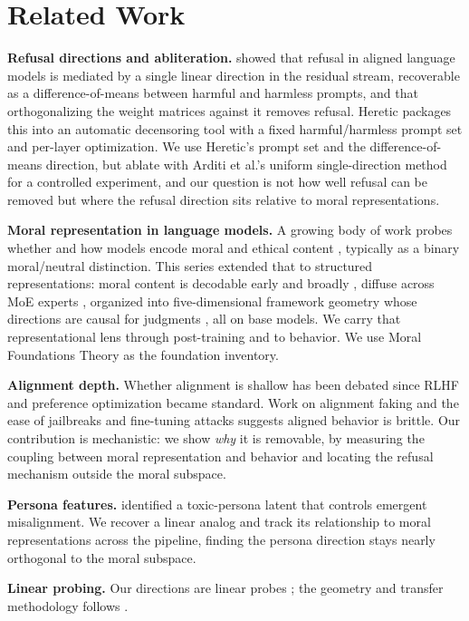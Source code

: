 \section{Related Work}\label{related-work}

\textbf{Refusal directions and abliteration.} \citet{arditi2024refusal} showed that
refusal in aligned language models is mediated by a single linear direction in
the residual stream, recoverable as a difference-of-means between harmful and
harmless prompts, and that orthogonalizing the weight matrices against it
removes refusal. Heretic \citep{pew2025heretic} packages this into an automatic
decensoring tool with a fixed harmful/harmless prompt set and per-layer
optimization. We use Heretic's prompt set and the difference-of-means
direction, but ablate with Arditi et al.'s uniform single-direction method for a
controlled experiment, and our question is not how well refusal can be removed
but where the refusal direction sits relative to moral representations.

\textbf{Moral representation in language models.} A growing body of work probes
whether and how models encode moral and ethical content
\citep{hendrycks2021ethics}, typically as a binary moral/neutral distinction.
This series extended that to structured representations: moral content is
decodable early and broadly \citep{reblitzrichardson2026fragility}, diffuse
across MoE experts \citep{reblitzrichardson2026dilution}, organized into
five-dimensional framework geometry \citep{reblitzrichardson2026geometry} whose
directions are causal for judgments \citep{reblitzrichardson2026causal}, all on
base models. We carry that representational lens through post-training and to
behavior. We use Moral Foundations Theory \citep{haidt2012righteous,
graham2013mft} as the foundation inventory.

\textbf{Alignment depth.} Whether alignment is shallow has been debated since RLHF
\citep{ouyang2022instructgpt} and preference optimization \citep{rafailov2023dpo}
became standard. Work on alignment faking \citep{greenblatt2024faking} and the
ease of jailbreaks and fine-tuning attacks suggests aligned behavior is brittle.
Our contribution is mechanistic: we show \emph{why} it is removable, by measuring the
coupling between moral representation and behavior and locating the refusal
mechanism outside the moral subspace.

\textbf{Persona features.} \citet{wang2025persona} identified a toxic-persona latent
that controls emergent misalignment. We recover a linear analog and track its
relationship to moral representations across the pipeline, finding the persona
direction stays nearly orthogonal to the moral subspace.

\textbf{Linear probing.} Our directions are linear probes \citep{alain2017probes};
the geometry and transfer methodology follows
\citet{reblitzrichardson2026geometry}.
